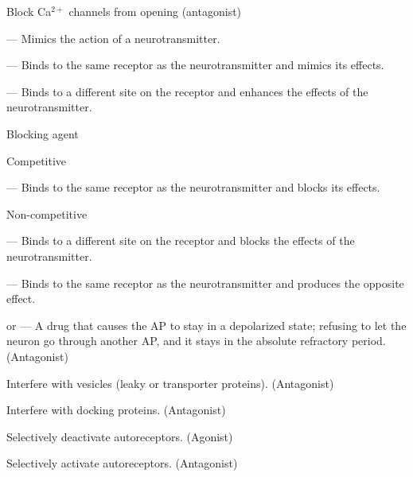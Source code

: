 \begin{coloredlist}
    \item Block Ca\(^{2+}\) channels from opening (antagonist)
    \item {} — Mimics the action of a neurotransmitter.
    \begin{coloredlist}
        \item {} — Binds to the same receptor as the neurotransmitter and mimics its effects.
        \item {} — Binds to a different site on the receptor and enhances the effects of the neurotransmitter.
    \end{coloredlist}
    \item Blocking agent
    \begin{coloredlist}
        \item Competitive
        \begin{coloredlist}
            \item {} — Binds to the same receptor as the neurotransmitter and blocks its effects.
        \end{coloredlist}
        \item Non-competitive
        \begin{coloredlist}
            \item {} — Binds to a different site on the receptor and blocks the effects of the neurotransmitter.
        \end{coloredlist}
        \item {} — Binds to the same receptor as the neurotransmitter and produces the opposite effect.
    \end{coloredlist}
    \item {} or  — A drug that causes the AP to stay in a depolarized state; refusing to let the neuron go through another AP, and it stays in the absolute refractory period. (Antagonist)
    \item Interfere with vesicles (leaky or transporter proteins). (Antagonist)
    \item Interfere with docking proteins. (Antagonist)
    \item Selectively deactivate autoreceptors. (Agonist)
    \item Selectively activate autoreceptors. (Antagonist)
\end{coloredlist}

